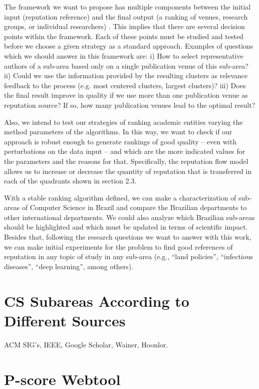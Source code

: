 \documentclass[msc]{ppgccufmg}
\begin{document}
\begin{appendices}
The framework we want to propose has multiple components between the initial input (reputation reference) and the final output (a ranking of venues, research groups, or individual researchers) . This implies that there are several decision points within the framework. Each of these points must be studied and tested before we choose a given strategy as a standard approach. Examples of questions which we should answer  in this framework are: i) How to select representative authors of a sub-area based only on a single publication venue of this sub-area? ii) Could we use the information provided by the resulting clusters as relevance feedback to the process (e.g. most centered clusters, largest clusters)? iii) Does the final result improve in quality if we use more than one publication venue as reputation source? If so, how many publication venues lead to the optimal result?

Also, we intend to test our strategies of ranking academic entities varying the method parameters of the algorithms. In this way, we want to check if our approach is robust enough to generate rankings of good quality -- even with perturbations on the data input -- and which are the more indicated values for the parameters and the reasons for that. Specifically, the reputation flow model allows us to increase or decrease the quantity of reputation that is transferred in each of the quadrants shown in section 2.3. %

With a stable ranking algorithm defined, we can make a characterization of sub-areas of Computer Science in Brazil and compare the Brazilian departments to other international departments. We could also analyze which Brazilian sub-areas should be highlighted and which must be updated in terms of scientific impact. Besides that, following the research questions we want to answer with this work, we can make initial experiments for the problem to find good references of reputation in any topic of study in any sub-area (e.g., ``land policies'', ``infectious diseases'', ``deep learning'', among others).

\chapter{CS Subareas According to Different Sources}\label{sec:cs-subareas}
ACM SIG's, IEEE, Google Scholar, Wainer, Hoonlor.

\chapter{P-score Webtool}\label{sec:webtool}


\end{appendices}
\end{document}
